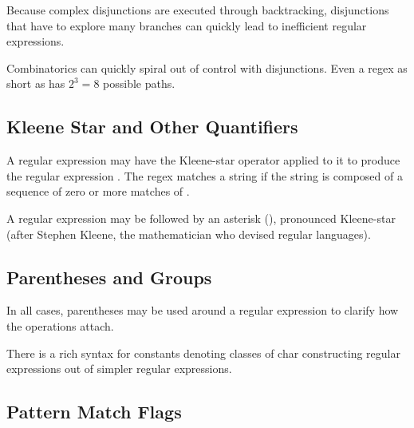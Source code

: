 Because complex disjunctions are executed through backtracking,
disjunctions that have to explore many branches can quickly lead to
inefficient regular expressions.

Combinatorics can quickly spiral out of control with disjunctions.
Even a regex as short as  has $2^3 = 8$
possible paths.  

\subsection{Kleene Star and Other Quantifiers}

A regular expression  may have the Kleene-star operator
applied to it to produce the regular expression \code{*}.
The regex \code{*} matches a string if the string is
composed of a sequence of zero or more matches of .

A regular expression may be followed by an asterisk (\code{*}),
pronounced Kleene-star (after Stephen Kleene, the mathematician who
devised regular languages).






\subsection{Parentheses and Groups}

In all cases, parentheses may be used around a regular expression to
clarify how the operations attach.




There is a rich syntax for constants denoting classes of char
constructing regular expressions out of
simpler regular expressions.

\subsection{Pattern Match Flags}\label{section:pattern-modes}

